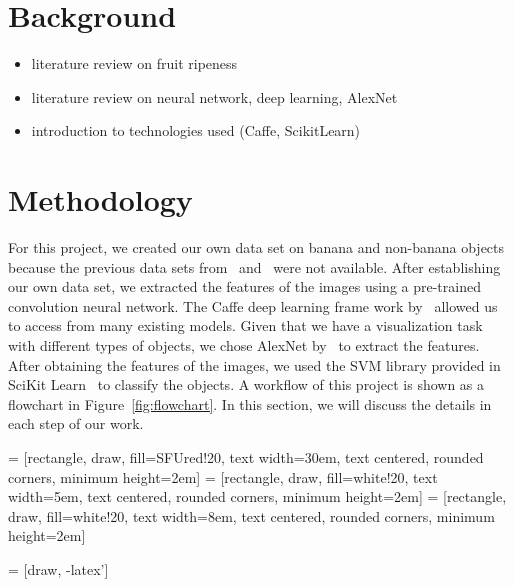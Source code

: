 \documentclass{article} %
\begin{document}
\section {Background}
\begin{itemize}
\item literature review on fruit ripeness
\item literature review on neural network, deep learning, AlexNet
\item introduction to technologies used (Caffe, ScikitLearn)
\end{itemize}
\section{Methodology}
For this project, we created our own data set on banana and non-banana objects because the previous data sets from~\citet{saad2009recognizing} and~\citet{paulraj2009color} were not available. After establishing our own data set, we extracted the features of the images using a pre-trained convolution neural network. The Caffe deep learning frame work by~\citet{jia2014caffe} allowed us to access from many existing models. Given that we have a visualization task with different types of objects, we chose AlexNet by~\citet{krizhevsky2012imagenet} to extract the features. After obtaining the features of the images, we used the SVM library provided in SciKit Learn~\citep{scikit-learn} to classify the objects. A workflow of this project is shown as a flowchart in Figure~\ref{fig:flowchart}. In this section, we will discuss the details in each step of our work. 

 = [rectangle, draw, fill=SFUred!20, 
    text width=30em, text centered, rounded corners, minimum height=2em]
     = [rectangle, draw, fill=white!20, 
    text width=5em, text centered, rounded corners, minimum height=2em]
         = [rectangle, draw, fill=white!20, 
    text width=8em, text centered, rounded corners, minimum height=2em]

 = [draw, -latex']
\end{document}
